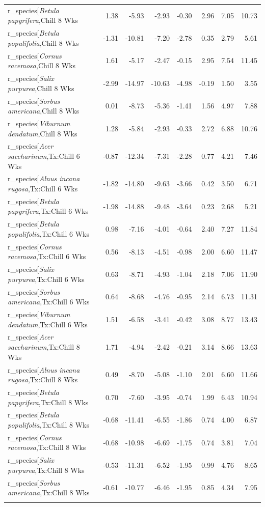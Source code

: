 \documentclass{article}\usepackage[]{graphicx}\usepackage[]{color}
\begin{document}
\begin{longtable}{lrrrrrrr}
  r_species[\textit{Betula papyrifera},Chill 8 Wks & 1.38 & -5.93 & -2.93 & -0.30 & 2.96 & 7.05 & 10.73 \\ 
  r_species[\textit{Betula populifolia},Chill 8 Wks & -1.31 & -10.81 & -7.20 & -2.78 & 0.35 & 2.79 & 5.61 \\ 
  r_species[\textit{Cornus racemosa},Chill 8 Wks & 1.61 & -5.17 & -2.47 & -0.15 & 2.95 & 7.54 & 11.45 \\ 
  r_species[\textit{Salix purpurea},Chill 8 Wks & -2.99 & -14.97 & -10.63 & -4.98 & -0.19 & 1.50 & 3.55 \\ 
  r_species[\textit{Sorbus americana},Chill 8 Wks & 0.01 & -8.73 & -5.36 & -1.41 & 1.56 & 4.97 & 7.88 \\ 
  r_species[\textit{Viburnum dendatum},Chill 8 Wks & 1.28 & -5.84 & -2.93 & -0.33 & 2.72 & 6.88 & 10.76 \\ 
  r_species[\textit{Acer saccharinum},Tx:Chill 6 Wks & -0.87 & -12.34 & -7.31 & -2.28 & 0.77 & 4.21 & 7.46 \\ 
  r_species[\textit{Alnus incana rugosa},Tx:Chill 6 Wks & -1.82 & -14.80 & -9.63 & -3.66 & 0.42 & 3.50 & 6.71 \\ 
  r_species[\textit{Betula papyrifera},Tx:Chill 6 Wks & -1.98 & -14.88 & -9.48 & -3.64 & 0.23 & 2.68 & 5.21 \\ 
  r_species[\textit{Betula populifolia},Tx:Chill 6 Wks & 0.98 & -7.16 & -4.01 & -0.64 & 2.40 & 7.27 & 11.84 \\ 
  r_species[\textit{Cornus racemosa},Tx:Chill 6 Wks & 0.56 & -8.13 & -4.51 & -0.98 & 2.00 & 6.60 & 11.47 \\ 
  r_species[\textit{Salix purpurea},Tx:Chill 6 Wks & 0.63 & -8.71 & -4.93 & -1.04 & 2.18 & 7.06 & 11.90 \\ 
  r_species[\textit{Sorbus americana},Tx:Chill 6 Wks & 0.64 & -8.68 & -4.76 & -0.95 & 2.14 & 6.73 & 11.31 \\ 
  r_species[\textit{Viburnum dendatum},Tx:Chill 6 Wks & 1.51 & -6.58 & -3.41 & -0.42 & 3.08 & 8.77 & 13.43 \\ 
  r_species[\textit{Acer saccharinum},Tx:Chill 8 Wks & 1.71 & -4.94 & -2.42 & -0.21 & 3.14 & 8.66 & 13.63 \\ 
  r_species[\textit{Alnus incana rugosa},Tx:Chill 8 Wks & 0.49 & -8.70 & -5.08 & -1.10 & 2.01 & 6.60 & 11.66 \\ 
  r_species[\textit{Betula papyrifera},Tx:Chill 8 Wks & 0.70 & -7.60 & -3.95 & -0.74 & 1.99 & 6.43 & 10.94 \\ 
  r_species[\textit{Betula populifolia},Tx:Chill 8 Wks & -0.68 & -11.41 & -6.55 & -1.86 & 0.74 & 4.00 & 6.87 \\ 
  r_species[\textit{Cornus racemosa},Tx:Chill 8 Wks & -0.68 & -10.98 & -6.69 & -1.75 & 0.74 & 3.81 & 7.04 \\ 
  r_species[\textit{Salix purpurea},Tx:Chill 8 Wks & -0.53 & -11.31 & -6.52 & -1.95 & 0.99 & 4.76 & 8.65 \\ 
  r_species[\textit{Sorbus americana},Tx:Chill 8 Wks & -0.61 & -10.77 & -6.46 & -1.95 & 0.85 & 4.34 & 7.95 \\ 
   \hline
\hline
\label{tab:suppmodtotbio}
\end{longtable}
\end{document}
